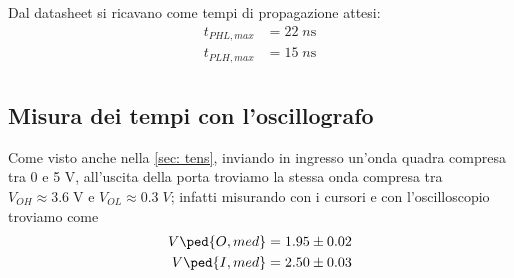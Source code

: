 \documentclass[10pt, a4paper, italian]{article}
\begin{document}
Dal datasheet si ricavano come tempi di propagazione attesi:
\begin{align*}
    t_{PHL,max} &= 22 \; \si{n\s} \\
    t_{PLH,max} &= 15 \; \si{n\s} \\
\end{align*}

\subsection{Misura dei tempi con l'oscillografo}
Come visto anche nella \cref{sec: tens}, inviando in ingresso un'onda quadra
compresa tra 0 e 5 V, all'uscita della porta troviamo la stessa onda compresa
tra $V_{OH} \approx 3.6 \; \si{\V}$ e $V_{OL} \approx 0.3  \; \si{V}$;
infatti misurando con i cursori e con l'oscilloscopio troviamo come
\begin{align*}
V\ped{O, med} = 1.95 \pm 0.02 \\
V\ped{I, med} = 2.50 \pm 0.03 \\
\end{align*}
\end{document}
